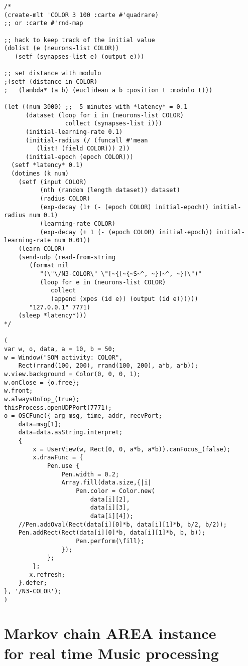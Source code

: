 \begin{lstlisting}[language=SuperCollider]
/*
(create-mlt 'COLOR 3 100 :carte #'quadrare) 
;; or :carte #'rnd-map

;; hack to keep track of the initial value
(dolist (e (neurons-list COLOR)) 
   (setf (synapses-list e) (output e)))

;; set distance with modulo
;(setf (distance-in COLOR) 
;   (lambda* (a b) (euclidean a b :position t :modulo t)))

(let ((num 3000) ;;  5 minutes with *latency* = 0.1
      (dataset (loop for i in (neurons-list COLOR) 
                 collect (synapses-list i)))
      (initial-learning-rate 0.1)
      (initial-radius (/ (funcall #'mean 
         (list! (field COLOR))) 2))
      (initial-epoch (epoch COLOR)))
  (setf *latency* 0.1)
  (dotimes (k num)
    (setf (input COLOR)
          (nth (random (length dataset)) dataset)
          (radius COLOR)
          (exp-decay (1+ (- (epoch COLOR) initial-epoch)) initial-radius num 0.1)
          (learning-rate COLOR)
          (exp-decay (+ 1 (- (epoch COLOR) initial-epoch)) initial-learning-rate num 0.01))
    (learn COLOR)
    (send-udp (read-from-string 
       (format nil 
          "(\"\/N3-COLOR\" \"[~{[~{~S~^, ~}]~^, ~}]\")" 
          (loop for e in (neurons-list COLOR) 
             collect 
             (append (xpos (id e)) (output (id e))))))
       "127.0.0.1" 7771)
    (sleep *latency*)))
*/

(
var w, o, data, a = 10, b = 50;
w = Window("SOM activity: COLOR",
    Rect(rrand(100, 200), rrand(100, 200), a*b, a*b));
w.view.background = Color(0, 0, 0, 1);
w.onClose = {o.free};
w.front;
w.alwaysOnTop_(true);
thisProcess.openUDPPort(7771);
o = OSCFunc({ arg msg, time, addr, recvPort;
    data=msg[1];
    data=data.asString.interpret;
    {
		x = UserView(w, Rect(0, 0, a*b, a*b)).canFocus_(false);
		x.drawFunc = {
			Pen.use {
				Pen.width = 0.2;
				Array.fill(data.size,{|i|
					Pen.color = Color.new(
						data[i][2], 
						data[i][3], 
						data[i][4]);
	//Pen.addOval(Rect(data[i][0]*b, data[i][1]*b, b/2, b/2));
	Pen.addRect(Rect(data[i][0]*b, data[i][1]*b, b, b));
					Pen.perform(\fill);
				});
			};
		};
       x.refresh;
    }.defer;
}, '/N3-COLOR');
)
\end{lstlisting}

\bigskip
\bigskip

\section{Markov chain AREA instance \\for real time Music processing}
\label{ann:mcone}

